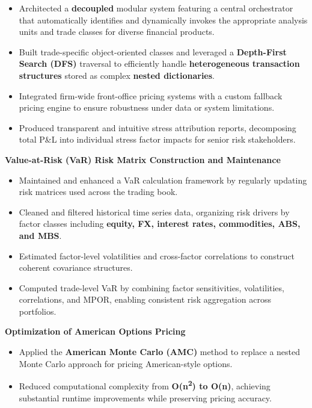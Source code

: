 \begin{cventries}
{\begin{cvitems}
\begin{itemize}
          \item Architected a \textbf{decoupled} modular system featuring a central orchestrator that automatically identifies and dynamically invokes the appropriate analysis units and trade classes for diverse financial products.
          \item Built {trade-specific object-oriented classes} and leveraged a \textbf{Depth-First Search (DFS)} traversal to efficiently handle \textbf{heterogeneous transaction structures} stored as complex \textbf{nested dictionaries}.
          \item Integrated firm-wide front-office pricing systems with a {custom fallback pricing engine} to ensure robustness under data or system limitations.
          \item Produced transparent and intuitive {stress attribution reports}, decomposing total P\&L into individual stress factor impacts for senior risk stakeholders.
        \end{itemize}
      \vspace{0.5mm}
      \item \textbf{Value-at-Risk (VaR) Risk Matrix Construction and Maintenance}
        \begin{itemize}
          \item Maintained and enhanced a VaR calculation framework by regularly updating {risk matrices} used across the trading book.
          \item {Cleaned and filtered historical time series data, organizing risk drivers by factor classes including \textbf{equity, FX, interest rates, commodities, ABS, and MBS}.}
          \item Estimated factor-level {volatilities and cross-factor correlations} to construct coherent covariance structures.
          \item Computed trade-level VaR by combining factor sensitivities, volatilities, correlations, and {MPOR}, enabling consistent risk aggregation across portfolios.
        \end{itemize}
      \vspace{0.5mm}
      \item \textbf{Optimization of American Options Pricing}
        \begin{itemize}
          \item Applied the \textbf{American Monte Carlo (AMC)} method to replace a nested Monte Carlo approach for pricing American-style options.
          \item Reduced computational complexity from \textbf{O(n\textsuperscript{2}) to O(n)}, achieving substantial runtime improvements while preserving pricing accuracy.
        \end{itemize}
    \end{cvitems}
  }



\end{cventries}
